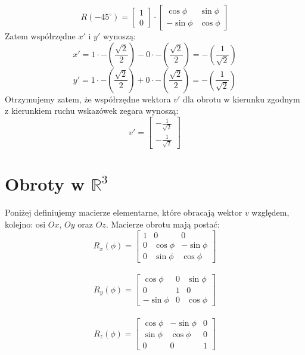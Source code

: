 \begin{przyklad}
\begin{equation*}
    R(-45^{\circ}) =
    \begin{bmatrix}
    1 \\
    0
    \end{bmatrix}
    \cdot
    \begin{bmatrix}
    \cos\phi & \sin\phi \\
    -\sin\phi & \cos\phi
    \end{bmatrix}
\end{equation*}
Zatem współrzędne $x'$ i $y'$ wynoszą:
\begin{equation*}
 x' = 1 \cdot -(\frac{\sqrt{2}}{2}) - 0 \cdot -(\frac{\sqrt{2}}{2})
     = -(\frac{1}{\sqrt{2}})
\end{equation*}
\begin{equation*}
     y' = 1 \cdot -(\frac{\sqrt{2}}{2}) + 0 \cdot -(\frac{\sqrt{2}}{2})
     = -(\frac{1}{\sqrt{2}})
\end{equation*}
Otrzymujemy zatem, że współrzędne wektora $v'$ dla obrotu w kierunku zgodnym z kierunkiem ruchu wskazówek zegara wynoszą: 
\begin{equation*}
v' =
    \begin{bmatrix}
    -\frac{1}{\sqrt{2}} \\
    -\frac{1}{\sqrt{2}}
    \end{bmatrix}
\end{equation*}
\end{przyklad}
\section{Obroty w \texorpdfstring{$\mathbb{R}^{3}$}{Obroty w R3} }
Poniżej definiujemy macierze elementarne, które obracają wektor $v$ względem, kolejno: osi $Ox$, $Oy$ oraz $Oz$. Macierze obrotu mają postać:
\begin{equation*}
R_{x}(\phi) =
    \begin{bmatrix}
    1 & 0 & 0 \\
    0 & \cos\phi & -\sin\phi \\
    0 & \sin\phi & \cos\phi 
    \end{bmatrix}
    \end{equation*}
    \\
    \begin{equation*}
    R_{y}(\phi) =
    \begin{bmatrix}
    \cos\phi & 0 & \sin\phi \\
    0 & 1 & 0  \\
    -\sin\phi & 0 & \cos\phi
    \end{bmatrix}
    \end{equation*}
    \\
    \begin{equation*}
        R_{z}(\phi) =
        \begin{bmatrix}
        \cos\phi & -\sin\phi & 0 \\
        \sin\phi & \cos\phi & 0 \\
        0 & 0 & 1
        \end{bmatrix}
    \end{equation*}

